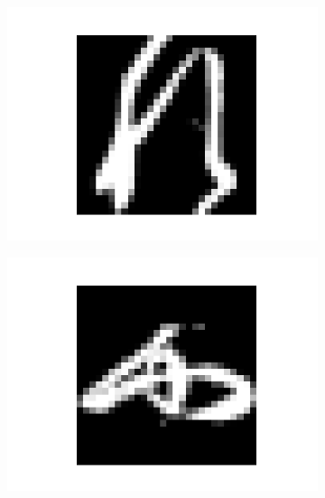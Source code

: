 \documentclass[14pt,a4paper]{extarticle}
\begin{document}
\begin{figure}[htb]
  \centering

  \begin{subfigure}[b]{0.3\textwidth}
    \includegraphics[width=\textwidth]{../res/kmnist/sample_0.png}
    \label{fig:kmnist_sample_0}
  \end{subfigure}
  \hfill
  \begin{subfigure}[b]{0.3\textwidth}
    \includegraphics[width=\textwidth]{../res/kmnist/sample_1.png}
    \label{fig:kmnist_sample_1}
  \end{subfigure}
  \hfill
  \begin{subfigure}[b]{0.3\textwidth}

\end{subfigure}
\end{figure}
\end{document}
